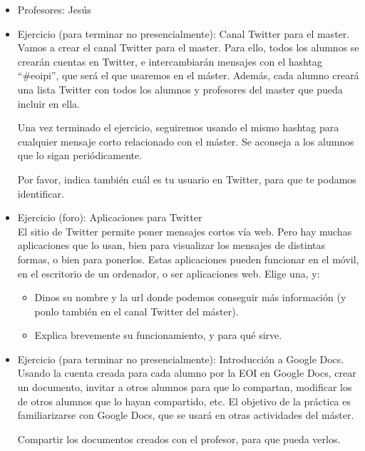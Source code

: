 \documentclass[a4paper,12pt]{article}
\begin{document}
\begin{itemize}
\item Profesores: Jesús
\item Ejercicio (para terminar no presencialmente): Canal Twitter para el master. \\
Vamos a crear el canal Twitter para el master. Para ello, todos los alumnos se crearán cuentas en Twitter, e intercambiarán mensajes con el hashtag ``\#eoipi'', que será el que usaremos en el máster. Además, cada alumno creará una lista Twitter con todos los alumnos y profesores del master que pueda incluir en ella.

Una vez terminado el ejercicio, seguiremos usando el mismo hashtag para cualquier mensaje corto relacionado con el máster. Se aconseja a los alumnos que lo sigan periódicamente.

Por favor, indica también cuál es tu usuario en Twitter, para que te podamos identificar.
\item Ejercicio (foro): Aplicaciones para Twitter \\
  El sitio de Twitter permite poner mensajes cortos vía web. Pero hay muchas aplicaciones que lo usan, bien para visualizar los mensajes de distintas formas, o bien para ponerlos. Estas aplicaciones pueden funcionar en el móvil, en el escritorio de un ordenador, o ser aplicaciones web. Elige una, y:

  \begin{itemize}
  \item Dinos su nombre y la url donde podemos conseguir más información (y ponlo también en el canal Twitter del máster).
  \item Explica brevemente su funcionamiento, y para qué sirve.
  \end{itemize}

\item Ejercicio (para terminar no presencialmente): Introducción a Google Docs. \\
Usando la cuenta creada para cada alumno por la EOI en Google Docs, crear un documento, invitar a otros alumnos para que lo compartan, modificar los de otros alumnos que lo hayan compartido, etc. El objetivo de la práctica es familiarizarse con Google Docs, que se usará en otras actividades del máster.

Compartir los documentos creados con el profesor, para que pueda verlos.
\end{itemize}


\end{document}
